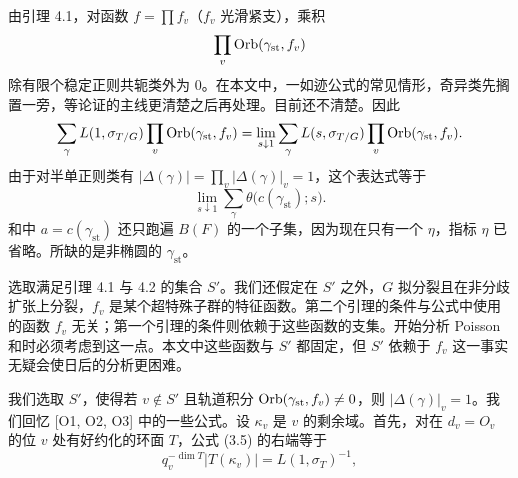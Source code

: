 由引理 4.1，对函数 $f=\prod f_v$（$f_v$ 光滑紧支），乘积
\[
\prod_v\mathrm{Orb}(\gamma_{\mathrm{st}},f_v)
\]
除有限个稳定正则共轭类外为 $0$。在本文中，一如迹公式的常见情形，奇异类先搁置一旁，等论证的主线更清楚之后再处理。目前还不清楚。因此
\[
\sum_\gamma L(1,\sigma_{T/G})\prod_v\mathrm{Orb}(\gamma_{\mathrm{st}},f_v)
=\lim_{s\downarrow1}\sum_\gamma L(s,\sigma_{T/G})\prod_v\mathrm{Orb}(\gamma_{\mathrm{st}},f_v).
\]
由于对半单正则类有 $|\Delta(\gamma)|=\prod_v|\Delta(\gamma)|_v=1$，这个表达式等于
\begin{equation}\tag{4.4}
\lim_{s\downarrow1}\sum_\gamma\theta\bigl(c(\gamma_{\mathrm{st}});s\bigr).
\end{equation}
和中 $a=c(\gamma_{\mathrm{st}})$ 还只跑遍 $B(F)$ 的一个子集，因为现在只有一个 $\eta$，指标 $\eta$ 已省略。所缺的是非椭圆的 $\gamma_{\mathrm{st}}$。

选取满足引理 4.1 与 4.2 的集合 $S'$。我们还假定在 $S'$ 之外，$G$ 拟分裂且在非分歧扩张上分裂，$f_v$ 是某个超特殊子群的特征函数。第二个引理的条件与公式中使用的函数 $f_v$ 无关；第一个引理的条件则依赖于这些函数的支集。开始分析 Poisson 和时必须考虑到这一点。本文中这些函数与 $S'$ 都固定，但 $S'$ 依赖于 $f_v$ 这一事实无疑会使日后的分析更困难。

我们选取 $S'$，使得若 $v\notin S'$ 且轨道积分 $\mathrm{Orb}(\gamma_{\mathrm{st}},f_v)\ne0$，则 $|\Delta(\gamma)|_v=1$。我们回忆 [O1, O2, O3] 中的一些公式。设 $\kappa_v$ 是 $v$ 的剩余域。首先，对在 $d_v=O_v$ 的位 $v$ 处有好约化的环面 $T$，公式 (3.5) 的右端等于
\begin{equation}\tag{4.5}
q_v^{-\dim T}|T(\kappa_v)|=L(1,\sigma_T)^{-1},
\end{equation}

